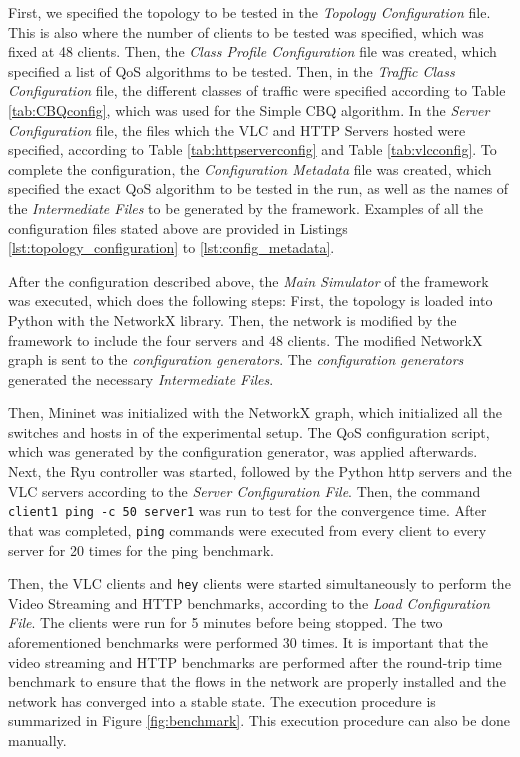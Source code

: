 First, we specified the topology to be tested in the \textit{Topology Configuration} file. This is also where the number of clients to be tested was specified, which was fixed at 48 clients. Then, the \textit{Class Profile Configuration} file was created, which specified a list of QoS algorithms to be tested. Then, in the \textit{Traffic Class Configuration} file, the different classes of traffic were specified according to Table \ref{tab:CBQconfig}, which was used for the Simple CBQ algorithm. In the \textit{Server Configuration} file, the files which the VLC and HTTP Servers hosted were specified, according to Table \ref{tab:httpserverconfig} and Table \ref{tab:vlcconfig}. To complete the configuration, the \textit{Configuration Metadata} file was created, which specified the exact QoS algorithm to be tested in the run, as well as the names of the \textit{Intermediate Files} to be generated by the framework. Examples of all the configuration files stated above are provided in Listings \ref{lst:topology_configuration} to \ref{lst:config_metadata}.

After the configuration described above, the \textit{Main Simulator} of the framework was executed, which does the following steps: First, the topology is loaded into Python with the NetworkX library. Then, the network is modified by the framework to include the four servers and 48 clients. The modified NetworkX graph is sent to the \textit{configuration generators}. The \textit{configuration generators} generated the necessary \textit{Intermediate Files}.

Then, Mininet was initialized with the NetworkX graph, which initialized all the switches and hosts in of the experimental setup. The QoS configuration script, which was generated by the configuration generator, was applied afterwards. Next, the Ryu controller was started, followed by the Python http servers and the VLC servers according to the \textit{Server Configuration File}. Then, the command \texttt{client1 ping -c 50 server1} was run to test for the convergence time. After that was completed, \texttt{ping} commands were executed from every client to every server for 20 times for the ping benchmark. 

Then, the VLC clients and \texttt{hey} clients were started simultaneously to perform the Video Streaming and HTTP benchmarks, according to the \textit{Load Configuration File}. The clients were run for 5 minutes before being stopped. The two aforementioned benchmarks were performed 30 times. It is important that the video streaming and HTTP benchmarks are performed after the round-trip time benchmark to ensure that the flows in the network are properly installed and the network has converged into a stable state. The execution procedure is summarized in Figure \ref{fig:benchmark}. This execution procedure can also be done manually.

